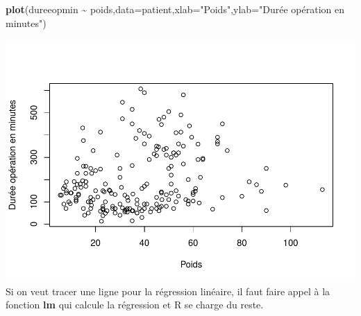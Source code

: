 \documentclass[
]{book}
\newenvironment{Shaded}{\begin{snugshade}}{\end{snugshade}}
\newcommand{\AttributeTok}[1]{\textcolor[rgb]{0.13,0.29,0.53}{#1}}
\newcommand{\FunctionTok}[1]{\textcolor[rgb]{0.13,0.29,0.53}{\textbf{#1}}}
\newcommand{\NormalTok}[1]{#1}
\newcommand{\OtherTok}[1]{\textcolor[rgb]{0.56,0.35,0.01}{#1}}
\newcommand{\SpecialCharTok}[1]{\textcolor[rgb]{0.81,0.36,0.00}{\textbf{#1}}}
\newcommand{\StringTok}[1]{\textcolor[rgb]{0.31,0.60,0.02}{#1}}
\begin{document}
\begin{Shaded}
\begin{Highlighting}[]
\FunctionTok{plot}\NormalTok{(dureeopmin }\SpecialCharTok{\textasciitilde{}}\NormalTok{ poids,}\AttributeTok{data=}\NormalTok{patient,}\AttributeTok{xlab=}\StringTok{"Poids"}\NormalTok{,}\AttributeTok{ylab=}\StringTok{"Durée opération en minutes"}\NormalTok{)}
\end{Highlighting}
\end{Shaded}

\includegraphics{_main_files/figure-latex/poids9-1.pdf}
Si on veut tracer une ligne pour la régression linéaire, il faut faire appel
à la fonction \textbf{lm} qui calcule la régression et R se charge du reste.

\begin{Shaded}
\end{Shaded}
\end{document}
